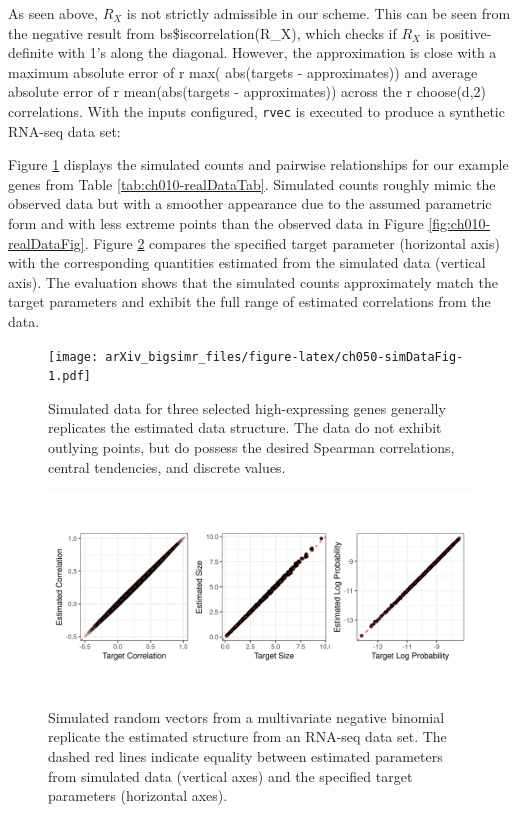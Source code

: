 \documentclass{article}
\newenvironment{Shaded}{\begin{snugshade}}{\end{snugshade}}
\newcommand{\DecValTok}[1]{\textcolor[rgb]{0.00,0.00,0.81}{#1}}
\newcommand{\FunctionTok}[1]{\textcolor[rgb]{0.00,0.00,0.00}{#1}}
\newcommand{\NormalTok}[1]{#1}
\newcommand{\OtherTok}[1]{\textcolor[rgb]{0.56,0.35,0.01}{#1}}
\newcommand{\SpecialCharTok}[1]{\textcolor[rgb]{0.00,0.00,0.00}{#1}}
\begin{document}
As seen above, \(R_X\) is not strictly admissible in our scheme. This
can be seen from the negative result from bs\$iscorrelation(R\_X), which
checks if \(R_X\) is positive-definite with 1's along the diagonal.
However, the approximation is close with a maximum absolute error of r
max( abs(targets - approximates)) and average absolute error of r
mean(abs(targets - approximates)) across the r choose(d,2) correlations.
With the inputs configured, \texttt{rvec} is executed to produce a
synthetic RNA-seq data set:

\begin{Shaded}
\end{Shaded}

Figure \ref{fig:ch050-simDataFig} displays the simulated counts and
pairwise relationships for our example genes from Table
\ref{tab:ch010-realDataTab}. Simulated counts roughly mimic the observed
data but with a smoother appearance due to the assumed parametric form
and with less extreme points than the observed data in Figure
\ref{fig:ch010-realDataFig}. Figure \ref{fig:ch050-figBRCA} compares the
specified target parameter (horizontal axis) with the corresponding
quantities estimated from the simulated data (vertical axis). The
evaluation shows that the simulated counts approximately match the
target parameters and exhibit the full range of estimated correlations
from the data.

\begin{figure}
\centering
\texttt{[image: arXiv\_bigsimr\_files/figure-latex/ch050-simDataFig-1.pdf]}
\caption{\label{fig:ch050-simDataFig}Simulated data for three selected
high-expressing genes generally replicates the estimated data structure.
The data do not exhibit outlying points, but do possess the desired
Spearman correlations, central tendencies, and discrete values.}
\end{figure}

\begin{figure}
\includegraphics[width=0.8\linewidth]{../fig/ch050-figBRCA} \caption{\label{fig:ch050-figBRCA}Simulated random vectors from a multivariate negative binomial replicate the estimated structure from an RNA-seq data set. The dashed red lines indicate equality between estimated parameters from simulated data (vertical axes) and the specified target parameters (horizontal axes).}\label{fig:ch050-figBRCA}
\end{figure}
\end{document}
